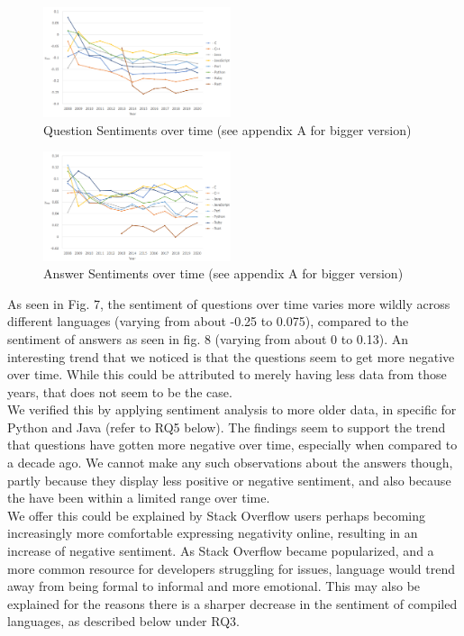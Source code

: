 \documentclass[conference]{IEEEtran}
\begin{document}
\begin{figure}[htbp]
\centerline{\includegraphics[width=0.49\textwidth]{figures/time_questions_em.png}}
\caption{Question Sentiments over time (see appendix A for bigger version)}
\label{fig}
\end{figure}

\begin{figure}[htbp]
\centerline{\includegraphics[width=0.49\textwidth]{figures/time_answers_em.png}}
\caption{Answer Sentiments over time (see appendix A for bigger version)}
\label{fig}
\end{figure}

As seen in Fig. 7, the sentiment of questions over time varies more wildly across different languages (varying from about -0.25 to 0.075), compared to the sentiment of answers as seen in fig. 8 (varying from about 0 to 0.13). An interesting trend that we noticed is that the questions seem to get more negative over time. While this could be attributed to merely having less data from those years, that does not seem to be the case.\\

We verified this by applying sentiment analysis to more older data, in specific for Python and Java (refer to RQ5 below). The findings seem to support the trend that questions have gotten more negative over time, especially when compared to a decade ago. We cannot make any such observations about the answers though, partly because they display less positive or negative sentiment, and also because the have been within a limited range over time.\\

We offer this could be explained by Stack Overflow users perhaps becoming increasingly more comfortable expressing negativity online, resulting in an increase of negative sentiment. As Stack Overflow became popularized, and a more common resource for developers struggling for issues, language would trend away from being formal to informal and more emotional. This may also be explained for the reasons there is a sharper decrease in the sentiment of compiled languages, as described below under RQ3.\\
\end{document}
